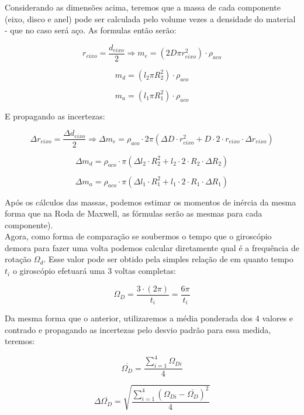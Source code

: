 Considerando as dimensões acima, teremos que a massa de cada componente (eixo, disco e anel) pode ser calculada pelo volume vezes a densidade do material - que no caso será aço. As formulas então serão:

\[ r_{eixo} = \frac{d_{eixo}}{2} \Rightarrow m_e = (2 D \pi r_{eixo}^2) \cdot \rho_{aco}\]

\[ m_d = (l_2 \pi R_2^2) \cdot \rho_{aco} \]

\[ m_a = (l_1 \pi R_1^2) \cdot \rho_{aco} \]

E propagando as incertezas:

\[ \Delta r_{eixo} = \frac{\Delta d_{eixo}}{2} \Rightarrow \Delta m_e = \rho_{aco} \cdot 2 \pi \left( \Delta D \cdot r_{eixo}^2 + D \cdot 2 \cdot r_{eixo} \cdot \Delta r_{eixo} \right)\]

\[ \Delta m_d = \rho_{aco} \cdot \pi \left( \Delta l_2 \cdot R_2^2 + l_2 \cdot 2 \cdot R_2 \cdot \Delta R_2 \right) \]

\[ \Delta m_a = \rho_{aco} \cdot \pi \left( \Delta l_1 \cdot R_1^2 + l_1 \cdot 2 \cdot R_1 \cdot \Delta R_1 \right) \]

Após os cálculos das massas, podemos estimar os momentos de inércia da mesma forma que na Roda de Maxwell, as fórmulas serão as mesmas para cada componente).\\

Agora, como forma de comparação se soubermos o tempo que o giroscópio demora para fazer uma volta podemos calcular diretamente qual é a frequência de rotação $\Omega _d$. Esse valor pode ser obtido pela simples relação de em quanto tempo $t_i$ o giroscópio efetuará uma 3 voltas completas:

\[\Omega _D = \frac{3 \cdot (2 \pi)}{t _i} = \frac{6\pi}{t _i}\]

Da mesma forma que o anterior, utilizaremos a média ponderada dos 4 valores e contrado e propagando as incertezas pelo desvio padrão para essa medida, teremos:

\[ \overline{\Omega _D} = \frac{\sum_{i=1}^{4} \Omega _{Di}}{4}\]

\[ \Delta \overline{\Omega _D} = \sqrt{\frac{\sum_{i=1}^{4} (\Omega _{Di} - \overline{\Omega _D})^2}{4}}\]
